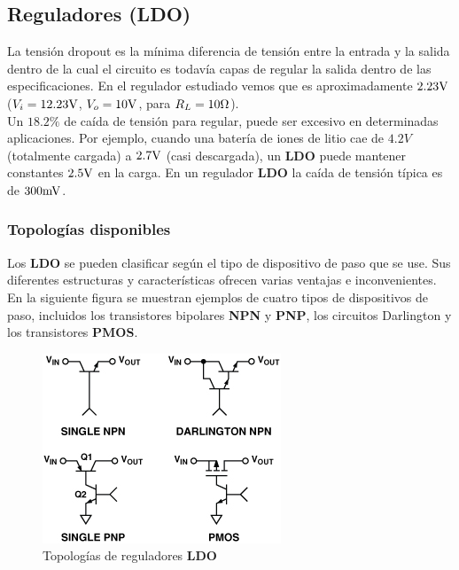 \subsection{Reguladores  (\textbf{LDO})}

La tensión dropout es la mínima diferencia de tensión entre la entrada y la salida dentro de la cual el circuito es todavía capas de regular la salida dentro de las especificaciones. En el regulador estudiado vemos que es aproximadamente $2.23 \si[per-mode=symbol]{\volt}$ ($V_{i} = 12.23 \si[per-mode=symbol]{\volt}$, $V_{o} = 10 \si[per-mode=symbol]{\volt}$, para $R_{L} = 10 \si[per-mode=symbol]{\ohm}$).\\
Un $18.2 \%$ de caída de tensión para regular, puede ser excesivo en determinadas aplicaciones. Por ejemplo, cuando una batería de iones de litio cae de $4.2 V$ (totalmente cargada) a $2.7 \si[per-mode=symbol]{\volt}$ (casi descargada), un \textbf{LDO} puede mantener constantes $2.5 \si[per-mode=symbol]{\volt}$ en la carga.
En un regulador \textbf{LDO} la caída de tensión típica es de $300 \si[per-mode=symbol]{\milli\volt}$.


\subsubsection{Topologías disponibles}

Los \textbf{LDO} se pueden clasificar según el tipo de dispositivo de paso que se use. Sus diferentes estructuras y características ofrecen varias ventajas e inconvenientes.
En la siguiente figura  se muestran ejemplos de cuatro tipos de dispositivos de paso, incluidos los transistores bipolares \textbf{NPN} y \textbf{PNP}, los circuitos Darlington y los transistores \textbf{PMOS}.


\begin{figure}[H] %
\begin{center}
\includegraphics[width=0.6 \textwidth, angle=0]{./img/reguladores/topologies.png}
\caption{\label{fig:fig_sziklai_cir_1}\footnotesize{Topologías de reguladores \textbf{LDO}}}
\end{center}
\end{figure}


